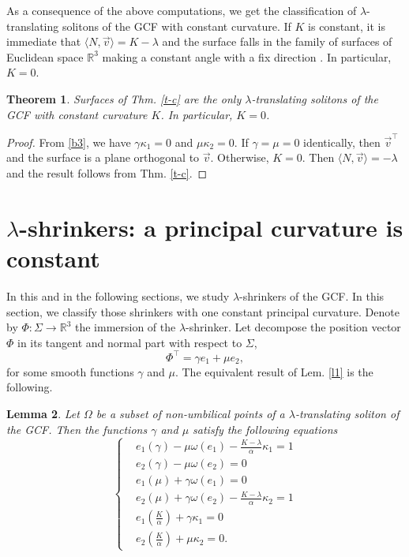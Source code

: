 \documentclass[a4paper,12pt]{amsart}
\newtheorem{theorem}{Theorem}[section]
\newtheorem{lemma}[theorem]{Lemma}
\theoremstyle{definition}
\def\r{\mathbb R}
\begin{document}
As a consequence of the above computations, we get the classification of $\lambda$-translating solitons of the GCF with constant curvature. If $K$ is constant, it is immediate that $\langle N,\vec{v}\rangle=K-\lambda$ and the surface   falls in the family of surfaces of Euclidean space $\r^3$ making a constant angle with a fix direction \cite{mn}. In particular, $K=0$.

\begin{theorem} Surfaces of Thm. \ref{t-c} are the only    $\lambda$-translating solitons of the GCF with constant curvature $K$. In particular, $K=0$. 
\end{theorem}

\begin{proof}
 From \eqref{b3}, we have   $\gamma\kappa_1=0$ and $\mu\kappa_2=0$. If $\gamma=\mu=0$ identically, then $\vec{v}^\top$ and the surface is a plane orthogonal to $\vec{v}$. Otherwise, $K=0$. Then $\langle N,\vec{v}\rangle=-\lambda$ and the result follows from Thm. \ref{t-c}. 
\end{proof}

\section{$\lambda$-shrinkers: a principal curvature is constant}\label{s5}

In this and in the following sections, we study $\lambda$-shrinkers of the GCF. In this section, we classify those shrinkers with one constant principal curvature.  Denote by $\Phi\colon\Sigma\to\r^3$ the immersion of the $\lambda$-shrinker. Let  decompose the position vector $\Phi$ in its tangent and normal part with respect to $\Sigma$,  
\begin{equation*}
\Phi^\top=\gamma e_1+\mu e_2,
\end{equation*}
for some smooth functions $\gamma$ and $\mu$. The equivalent  result of Lem. \ref{l1} is the following. 
 
\begin{lemma}\label{l2}
Let $\Omega$ be a subset of non-umbilical points of a $\lambda$-translating soliton of the GCF. Then the functions   $\gamma$ and $\mu$ satisfy the following equations
    \begin{equation}\label{d3}
    \left\{
\begin{split}
            &e_{1}(\gamma)-\mu\omega(e_1)-\frac{K-\lambda}{\alpha}\kappa_1=1\\
            &e_{2}(\gamma)-\mu\omega(e_2)=0\\
            &e_{1}(\mu)+\gamma\omega(e_1)=0\\
            &e_{2}(\mu)+\gamma\omega(e_2)-\frac{K-\lambda}{\alpha}\kappa_2=1\\
            &e_{1}(\frac{K}{\alpha})+\gamma\kappa_1=0\\
            &e_{2}(\frac{K}{\alpha})+\mu\kappa_2=0.
        \end{split}\right.
    \end{equation}
\end{lemma}
\end{document}
